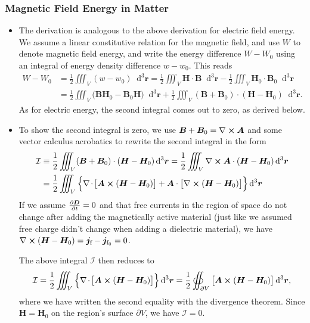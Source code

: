 \documentclass[11pt, a4paper]{article}
\newcommand{\diff}{\mathop{}\!\mathrm{d}} %
\newcommand{\dr}{\diff^{3} \r}  %
\renewcommand{\vec}[1]{\bm{#1}} %
\renewcommand{\r}{\vec{r}}
\newcommand{\D}{\vec{D}}  %
\newcommand{\B}{\vec{B}} %
\renewcommand{\H}{\vec{H}}  %
\newcommand{\A}{\vec{A}} %
\renewcommand{\j}{\vec{j}}  %
\renewcommand{\div}{\nabla \mspace{-2mu} \cdot \mspace{-2mu}}
\renewcommand{\curl}{\nabla \cross}
\begin{document}
\subsubsection{Magnetic Field Energy in Matter}
\begin{itemize}
	\item The derivation is analogous to the above derivation for electric field energy. We assume a linear constitutive relation for the magnetic field, and use $ W $ to denote magnetic field energy, and write the energy difference $ W - W_{0} $ using an integral of energy density difference $ w - w_{0} $. This reads
	\begin{align*}
        W - W_{0} &= \frac{1}{2}\iiint_{V}(w - w_{0}) \dr = \frac{1}{2} \iiint_{V} \H \cdot \B  \dr - \frac{1}{2}\iiint_{V}\H_{0}\cdot\B_{0}\dr\\
		& = \frac{1}{2}\iiint_{V}\big(\B \H_{0} - \B_{0}\H\big)\dr + \frac{1}{2}\iiint_{V}(\B + \B_{0})\cdot(\H - \H_{0}) \dr.
	\end{align*}
    As for electric energy, the second integral comes out to zero, as derived below.

    \item To show the second integral is zero, we use $ \B + \B_{0} = \curl \A $ and some vector calculus acrobatics to rewrite the second integral in the form
    \begin{align*}
        \mathcal{I} & \equiv \frac{1}{2}\iiint_{V}(\B + \B_{0})\cdot(\H - \H_{0}) \dr = \frac{1}{2}\iiint_{V}\curl \A \cdot (\H - \H_{0}) \dr\\
        & = \frac{1}{2} \iiint_{V} \Big\{ \div \big[ \A \cross (\H - \H_{0}) \big] + \A \cdot \big[ \curl (\H - \H_{0}) \big] \Big \} \dr
    \end{align*}
    If we assume $ \pdv{\D}{t} = 0 $ and that free currents in the region of space do not change after adding the magnetically active material (just like we assumed free charge didn't change when adding a dielectric material), we have $ \curl (\H - \H_{0}) = \j_{\text{f}} - \j_{\text{f}_{0}} = 0 $. 

    The above integral $ \mathcal{I} $ then reduces to
    \begin{equation*}
        \mathcal{I} = \frac{1}{2} \iiint_{V} \Big\{ \div \big[ \A \cross (\H - \H_{0}) \big] \Big \} \dr = \frac{1}{2} \oiint_{\partial V} \big[ \A \cross (\H - \H_{0}) \big] \dr,
    \end{equation*}
    where we have written the second equality with the divergence theorem. Since $ \H = \H_{0} $ on the region's surface $ \partial V $, we have $ \mathcal{I} = 0 $.


\end{itemize}
\end{document}
